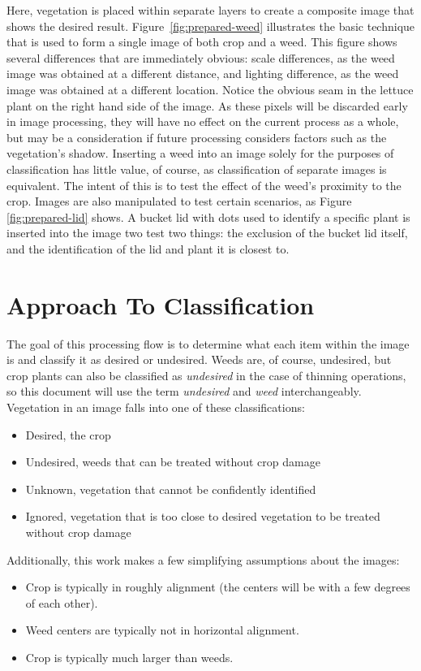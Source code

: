 \documentclass[letterpaper]{article}
\begin{document}
Here, vegetation is placed within separate layers to create a composite image that shows the desired result.  Figure~\ref{fig:prepared-weed} illustrates the basic technique that is used to form a single image of both crop and a weed. This figure shows several differences that are immediately obvious: scale differences, as the weed image was obtained at a different distance, and lighting difference, as the weed image was obtained at a different location. Notice the obvious seam in the lettuce plant on the right hand side of the image. As these pixels will be discarded early in image processing, they will have no effect on the current process as a whole, but may be a consideration if future processing considers factors such as the vegetation’s shadow. Inserting a weed into an image solely for the purposes of classification has little value, of course, as classification of separate images is equivalent. The intent of this is to test the effect of the weed's proximity to the crop. Images are also manipulated to test certain scenarios, as Figure \ref{fig:prepared-lid} shows. A bucket lid with dots used to identify a specific plant is inserted into the image two test two things: the exclusion of the bucket lid itself, and the identification of the lid and plant it is closest to.



\section{Approach To Classification}
The goal of this processing flow is to determine what each item within the image is and classify it as desired or undesired. Weeds are, of course, undesired, but crop plants can also be classified as \textit{undesired} in the case of thinning operations, so this document will use the term \textit{undesired} and \textit{weed} interchangeably. Vegetation in an image falls into one of these classifications:
\begin{itemize}
	\item{Desired, the crop}
	\item{Undesired, weeds that can be treated without crop damage}
	\item{Unknown, vegetation that cannot be confidently identified}
	\item{Ignored, vegetation that is too close to desired vegetation to be treated without crop damage}
\end{itemize}

Additionally, this work makes a few simplifying assumptions about the images:
\begin{itemize}
	\item{Crop is typically in roughly alignment (the centers will be with a few degrees of each other).}
	\item{Weed centers are typically not in horizontal alignment.}
	\item{Crop is typically much larger than weeds.}
\end{itemize}
\end{document}
